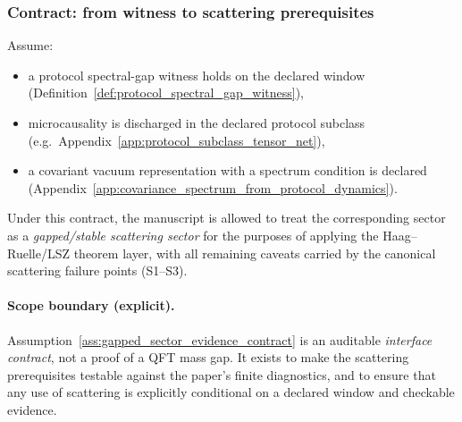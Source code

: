\subsubsection{Contract: from witness to scattering prerequisites}
\begin{assumption}[Gapped-sector evidence contract (protocol \texorpdfstring{$\Rightarrow$}{=>} scattering)]
\label{ass:gapped_sector_evidence_contract}
Assume:
\begin{itemize}
\item a protocol spectral-gap witness holds on the declared window (Definition~\ref{def:protocol_spectral_gap_witness}),
\item microcausality is discharged in the declared protocol subclass (e.g.\ Appendix~\ref{app:protocol_subclass_tensor_net}),
\item a covariant vacuum representation with a spectrum condition is declared (Appendix~\ref{app:covariance_spectrum_from_protocol_dynamics}).
\end{itemize}
Under this contract, the manuscript is allowed to treat the corresponding sector as a \emph{gapped/stable scattering sector} for the purposes of applying the Haag--Ruelle/LSZ theorem layer, with all remaining caveats carried by the canonical scattering failure points (S1--S3).
\end{assumption}

\paragraph{Scope boundary (explicit).}
\AuditTag Assumption~\ref{ass:gapped_sector_evidence_contract} is an auditable \emph{interface contract}, not a proof of a QFT mass gap.
It exists to make the scattering prerequisites testable against the paper's finite diagnostics, and to ensure that any use of scattering is explicitly conditional on a declared window and checkable evidence.

